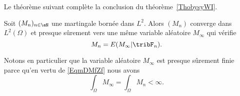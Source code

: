Le théorème suivant complète la conclusion du théorème~\ref{ThobysyWI}.
\begin{theorem} \label{ThofcttYW}
    Soit \( (M_n)_{n\in \eN}\) une martingale bornée dans \( L^2\). Alors \( (M_n)\) converge dans \( L^2(\Omega)\) et presque sûrement vers une même variable aléatoire \( M_{\infty}\) qui vérifie
    \begin{equation}        \label{EqmDMfZf}
        M_n=E(M_{\infty}|\tribF_n).
    \end{equation}
\end{theorem}

Notons en particulier que la variable aléatoire \( M_{\infty}\) est presque sûrement finie parce qu'en vertu de \eqref{EqmDMfZf} nous avons
\begin{equation}
    \int_{\Omega}M_{\infty}=\int_{\Omega}M_n<\infty.
\end{equation}

